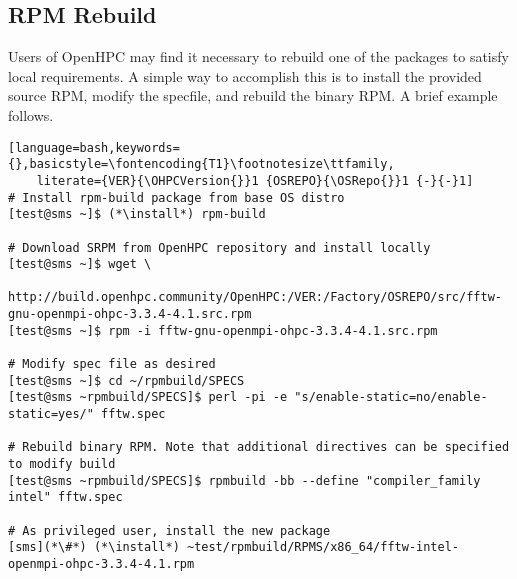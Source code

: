 \subsection{RPM Rebuild}  \label{appendix:rpmbuild}

Users of OpenHPC may find it necessary to rebuild one of the packages to satisfy
local requirements. A simple way to accomplish this is to install the provided
source RPM, modify the specfile, and rebuild the binary RPM. A brief example
follows.

\begin{lstlisting}[language=bash,keywords={},basicstyle=\fontencoding{T1}\footnotesize\ttfamily,
    literate={VER}{\OHPCVersion{}}1 {OSREPO}{\OSRepo{}}1 {-}{-}1]
# Install rpm-build package from base OS distro
[test@sms ~]$ (*\install*) rpm-build

# Download SRPM from OpenHPC repository and install locally
[test@sms ~]$ wget \
  http://build.openhpc.community/OpenHPC:/VER:/Factory/OSREPO/src/fftw-gnu-openmpi-ohpc-3.3.4-4.1.src.rpm
[test@sms ~]$ rpm -i fftw-gnu-openmpi-ohpc-3.3.4-4.1.src.rpm

# Modify spec file as desired
[test@sms ~]$ cd ~/rpmbuild/SPECS
[test@sms ~rpmbuild/SPECS]$ perl -pi -e "s/enable-static=no/enable-static=yes/" fftw.spec

# Rebuild binary RPM. Note that additional directives can be specified to modify build
[test@sms ~rpmbuild/SPECS]$ rpmbuild -bb --define "compiler_family intel" fftw.spec

# As privileged user, install the new package
[sms](*\#*) (*\install*) ~test/rpmbuild/RPMS/x86_64/fftw-intel-openmpi-ohpc-3.3.4-4.1.rpm
\end{lstlisting}
